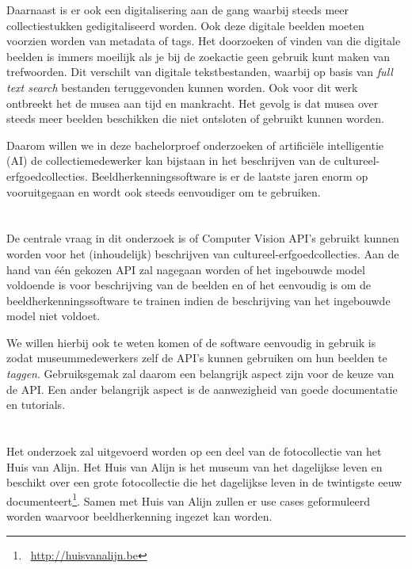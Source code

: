Daarnaast is er ook een digitalisering aan de gang waarbij steeds meer collectiestukken gedigitaliseerd worden. Ook deze digitale beelden moeten voorzien worden van metadata of tags. Het doorzoeken of vinden van die digitale beelden is immers moeilijk als je bij de zoekactie geen gebruik kunt maken van trefwoorden. Dit verschilt van digitale tekstbestanden, waarbij op basis van \textit{full text search} bestanden teruggevonden kunnen worden. Ook voor dit werk ontbreekt het de musea aan tijd en mankracht. Het gevolg is dat musea over steeds meer beelden beschikken die niet ontsloten of gebruikt kunnen worden. 

Daarom willen we in deze bachelorproef onderzoeken of artificiële intelligentie (AI) de collectiemedewerker kan bijstaan in het beschrijven van de cultureel-erfgoedcollecties. Beeldherkenningssoftware is er de laatste jaren enorm op vooruitgegaan en wordt ook steeds eenvoudiger om te gebruiken.

\section{}
\label{sec:onderzoeksvraag}

De centrale vraag in dit onderzoek is of Computer Vision API’s gebruikt kunnen worden voor het (inhoudelijk) beschrijven van cultureel-erfgoedcollecties. Aan de hand van één gekozen API zal nagegaan worden of het ingebouwde model voldoende is voor beschrijving van de beelden en of het eenvoudig is om de beeldherkenningssoftware te trainen indien de beschrijving van het ingebouwde model niet voldoet. 

We willen hierbij ook te weten komen of de software eenvoudig in gebruik is zodat museummedewerkers zelf de API’s kunnen gebruiken om hun beelden te \textit{taggen}. Gebruiksgemak zal daarom een belangrijk aspect zijn voor de keuze van de API. Een ander belangrijk aspect is de aanwezigheid van goede documentatie en tutorials.

\section{}
\label{sec:onderzoeksdoelstelling}

Het onderzoek zal uitgevoerd worden op een deel van de fotocollectie van het Huis van Alijn. Het Huis van Alijn is het museum van het dagelijkse leven en beschikt over een grote fotocollectie die het dagelijkse leven in de twintigste eeuw documenteert\footnote{~\url{http://huisvanalijn.be}}. Samen met Huis van Alijn zullen er use cases geformuleerd worden waarvoor beeldherkenning ingezet kan worden.


